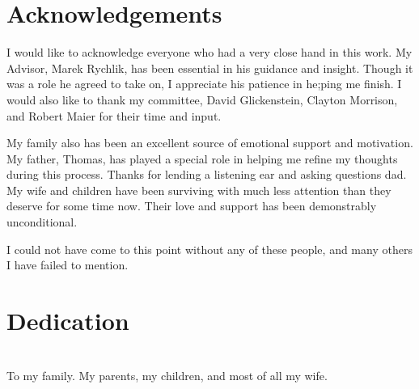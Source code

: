 \thispagestyle{empty}
\maketitle

\thispagestyle{empty}
\iffinal

\chapter*{Acknowledgements}
I would like to acknowledge everyone who had a very close hand in this work. 
My Advisor, Marek Rychlik, has been essential in his guidance and insight. Though it was a role he agreed to take on, I appreciate his patience in he;ping me finish. I would also like to thank my committee, David Glickenstein, Clayton Morrison, and Robert Maier for their time and input. 

My family also has been an excellent source of emotional support and motivation. My father, Thomas, has played a special role in helping me refine my thoughts during this process. Thanks for lending a listening ear and asking questions dad. My wife and children have been surviving with much less attention than they deserve for some time now. Their love and support has been demonstrably unconditional.

I could not have come to this point without any of these people, and many others I have failed to mention.

\newpage


\thispagestyle{empty}
\chapter*{Dedication}
\begin{center}
	\ \\
	To my family. My parents, my children, and most of all my wife.
\end{center}
\newpage
\fi


\tableofcontents
\let\tableofcontents\relax

\listoffigures
\let\listoffigures\relax

\listoftables
\let\listoftables\relax

\newpage


